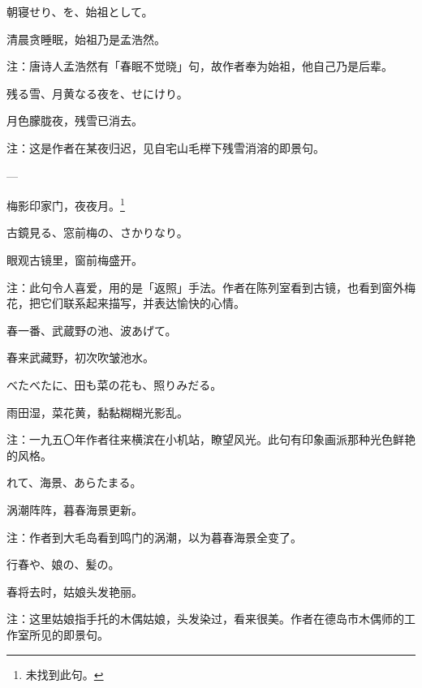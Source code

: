 \begin{haiku}
    {\FH 朝寝せり、を、始祖として。}

    {\FK 清晨贪睡眠，始祖乃是孟浩然。}

    {\FT 注：唐诗人孟浩然有「春眠不觉晓」句，故作者奉为始祖，他自己乃是后辈。}
\end{haiku}

\begin{haiku}
    {\FH 残る雪、月黄なる夜を、せにけり。}

    {\FK 月色朦胧夜，残雪已消去。}

    {\FT 注：这是作者在某夜归迟，见自宅山毛榉下残雪消溶的即景句。}
\end{haiku}

\begin{haiku}
    {\FH ---}

    {\FK 梅影印家门，夜夜月。\footnote{\FT 未找到此句。}}
\end{haiku}

\begin{haiku}
    {\FH 古鏡見る、窓前梅の、さかりなり。}

    {\FK 眼观古镜里，窗前梅盛开。}

    {\FT 注：此句令人喜爱，用的是「返照」手法。作者在陈列室看到古镜，也看到窗外梅花，把它们联系起来描写，并表达愉快的心情。}
\end{haiku}

\begin{haiku}
    {\FH 春一番、武蔵野の池、波あげて。}

    {\FK 春来武藏野，初次吹皱池水。}
\end{haiku}

\begin{haiku}
    {\FH べたべたに、田も菜の花も、照りみだる。}

    {\FK 雨田湿，菜花黄，黏黏糊糊光影乱。}

    {\FT 注：一九五〇年作者往来横滨在小机站，瞭望风光。此句有印象画派那种光色鲜艳的风格。}
\end{haiku}

\begin{haiku}
    {\FH {}れて、海景、あらたまる。}

    {\FK 涡潮阵阵，暮春海景更新。}

    {\FT 注：作者到大毛岛看到鸣门的涡潮，以为暮春海景全变了。}
\end{haiku}

\begin{haiku}
    {\FH 行春や、娘の、髪の。}

    {\FK 春将去时，姑娘头发艳丽。}

    {\FT 注：这里姑娘指手托的木偶姑娘，头发染过，看来很美。作者在德岛市木偶师的工作室所见的即景句。}
\end{haiku}


